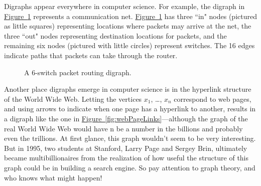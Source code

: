 \documentclass[11pt,oneside]{book}
\theoremstyle{definition}
\begin{document}
Digraphs appear everywhere in computer science.
For example, the digraph in \hyperref[fig:routingDigraph]{Figure~\ref*{fig:routingDigraph}} represents a communication net.
\hyperref[fig:routingDigraph]{Figure~\ref*{fig:routingDigraph}} has three ``in" nodes (pictured as little squares) representing locations where packets may arrive at the net, the three ``out" nodes representing destination locations for packets, and the remaining six nodes (pictured with little circles) represent switches.
The 16 edges indicate paths that packets can take through the router.

\begin{figure}[H]
  \centering
  \caption{A 6-switch packet routing digraph.}
  \label{fig:routingDigraph}
\end{figure}

Another place digraphs emerge in computer science is in the hyperlink structure of the World Wide Web.
Letting the vertices $x_{1}$, \dots, $x_{n}$ correspond to web pages, and using arrows to indicate when one page has a hyperlink to another, results in a digraph like the one in \hyperref[fig:webPageLinks]{Figure~\ref*{fig:webPageLinks}}---although the graph of the real World Wide Web would have n be a number in the billions and probably even the trillions.
At first glance, this graph wouldn't seem to be very interesting.
But in 1995, two students at Stanford, Larry Page and Sergey Brin, ultimately became multibillionaires from the realization of how useful the structure of this graph could be in building a search engine.
So pay attention to graph theory, and who knows what might happen!
\end{document}
